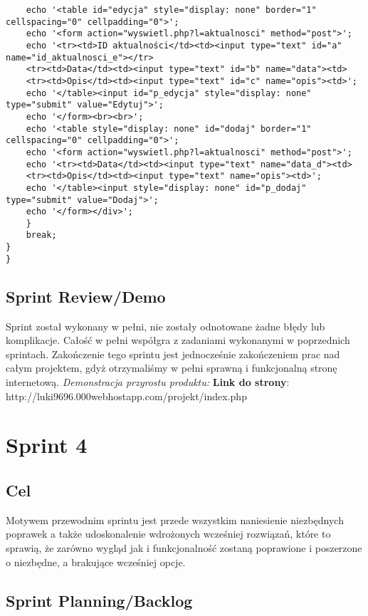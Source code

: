 \documentclass[a4paper]{article} \usepackage{polski} \usepackage[cp1250]{inputenc} \usepackage{url}
\begin{document}
\begin{verbatim}
	echo '<table id="edycja" style="display: none" border="1" cellspacing="0" cellpadding="0">';
	echo '<form action="wyswietl.php?l=aktualnosci" method="post">';
	echo '<tr><td>ID aktualności</td><td><input type="text" id="a" name="id_aktualnosci_e"></tr>
	<tr><td>Data</td><td><input type="text" id="b" name="data"><td>
	<tr><td>Opis</td><td><input type="text" id="c" name="opis"><td>';
	echo '</table><input id="p_edycja" style="display: none" type="submit" value="Edytuj">';
	echo '</form><br><br>';
	echo '<table style="display: none" id="dodaj" border="1" cellspacing="0" cellpadding="0">';
	echo '<form action="wyswietl.php?l=aktualnosci" method="post">';
	echo '<tr><td>Data</td><td><input type="text" name="data_d"><td>
	<tr><td>Opis</td><td><input type="text" name="opis"><td>';
	echo '</table><input style="display: none" id="p_dodaj" type="submit" value="Dodaj">';
	echo '</form></div>';
	}
	break;
}
}
     \end{verbatim}


\subsection{Sprint Review/Demo}\label{Sprint33demo} Sprint został wykonany w pełni, nie zostały odnotowane żadne błędy lub komplikacje. Całość w pełni współgra z zadaniami wykonanymi w poprzednich sprintach. Zakończenie tego sprintu jest jednocześnie zakończeniem prac nad całym projektem, gdyż otrzymaliśmy w pełni sprawną i funkcjonalną stronę internetową.
\newline
\textit{Demonstracja przyrostu produktu:}\newline
\newline
\textbf{Link do strony}: http://luki9696.000webhostapp.com/projekt/index.php


\section{Sprint 4}
\label{Sprint22}
\subsection{Cel} Motywem przewodnim sprintu jest przede wszystkim naniesienie niezbędnych poprawek a także udoskonalenie wdrożonych wcześniej rozwiązań, które to sprawią, że zarówno wygląd jak i funkcjonalność zostaną poprawione i poszerzone o niezbędne, a brakujące wcześniej opcje.
\label{Sprint4cel} 

\subsection{Sprint Planning/Backlog}
\label{Sprint4SPB}
\end{document}
